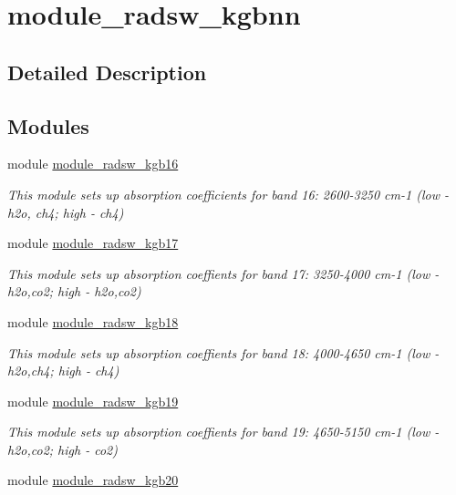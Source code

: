 \hypertarget{group__module__radsw__kgbnn}{}\section{module\+\_\+radsw\+\_\+kgbnn}
\label{group__module__radsw__kgbnn}


\subsection{Detailed Description}
\subsection*{Modules}
\begin{DoxyCompactItemize}
\item 
module \hyperlink{namespacemodule__radsw__kgb16}{module\+\_\+radsw\+\_\+kgb16}
\begin{DoxyCompactList}\small\item\em This module sets up absorption coefficients for band 16\+: 2600-\/3250 cm-\/1 (low -\/ h2o, ch4; high -\/ ch4) \end{DoxyCompactList}\item 
module \hyperlink{namespacemodule__radsw__kgb17}{module\+\_\+radsw\+\_\+kgb17}
\begin{DoxyCompactList}\small\item\em This module sets up absorption coeffients for band 17\+: 3250-\/4000 cm-\/1 (low -\/ h2o,co2; high -\/ h2o,co2) \end{DoxyCompactList}\item 
module \hyperlink{namespacemodule__radsw__kgb18}{module\+\_\+radsw\+\_\+kgb18}
\begin{DoxyCompactList}\small\item\em This module sets up absorption coeffients for band 18\+: 4000-\/4650 cm-\/1 (low -\/ h2o,ch4; high -\/ ch4) \end{DoxyCompactList}\item 
module \hyperlink{namespacemodule__radsw__kgb19}{module\+\_\+radsw\+\_\+kgb19}
\begin{DoxyCompactList}\small\item\em This module sets up absorption coeffients for band 19\+: 4650-\/5150 cm-\/1 (low -\/ h2o,co2; high -\/ co2) \end{DoxyCompactList}\item 
module \hyperlink{namespacemodule__radsw__kgb20}{module\+\_\+radsw\+\_\+kgb20}

\end{DoxyCompactItemize}
